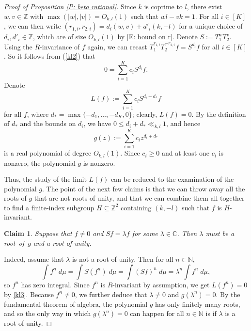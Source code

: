 \documentclass[11pt]{amsart}
\newtheorem{claim}[lemma]{Claim}
\theoremstyle{definition}
\newcommand{\N}{{\mathbb N}}
\newcommand{\Z}{{\mathbb Z}}
\newcommand{\1}{{\mathbf{1}}}
\begin{document}
\begin{proof}[Proof of Proposition \ref{P: beta rational}]
Since $k$ is coprime to $l$, there exist $w,v\in\mathbb{Z}$ with $\max(\vert w\vert, |v|)=O_{k,l}(1)$ such that $wl-vk=1$. For all $i\in[K]$, we can then write $(r_{1,i}, r_{2,i}) = d_{i}(w,v)+d'_{i}(k,-l)$ for a unique choice of $d_i, d'_i\in\Z$, which are of size $O_{k,l}(1)$ by \eqref{E: bound on r}. Denote $S:=T_1^w T_2^v$. Using the $R$-invariance of $f$ again, we can recast
$T_1^{r_{1,i}}T_2^{-r_{2,i}} f = S^{d_i} f$ for all $i\in[K]$. %
So it follows from (\ref{kl2}) that 
\begin{equation}\label{kl3}
    0=\sum_{i=1}^{K}c_{i}S^{d_{i}}f. %
\end{equation}
Denote 
$$L(f):=\sum_{i=1}^{K}c_{i}S^{d_{i}+d_{\ast}}f$$
for all $f$, where $d_{\ast}=\max\{-d_{1},\dots,-d_{K},0\}$; clearly, $L(f) = 0$. 
By the definition of $d_*$ and the bounds on $d_i$, we have $0\leq d_{i}+d_{\ast} \ll_{k,l}1$, and hence
$$g(z):=\sum_{i=1}^{K}c_{i}z^{d_{i}+d_{\ast}}$$ is a real polynomial of degree $O_{k,l}(1)$. Since $c_{i}\geq 0$ and at least one $c_{i}$ is nonzero, the polynomial $g$ is nonzero. 

Thus, the study of the limit $L(f)$ can be reduced to the examination of the polynomial $g$. The point of the next few claims is that we can throw away all the roots of $g$ that are not roots of unity, and that we can combine them all together to find a finite-index subgroup $H\subseteq\Z^2$ containing $(k,-l)$ such that $f$ is $H$-invariant.
    
\begin{claim}\label{Claim 1}
Suppose that $f\neq 0$ and $Sf=\lambda f$ for some $\lambda\in\mathbb{C}$.
Then $\lambda$ must be a root~of~$g$ and a root of unity. 
\end{claim}

Indeed, assume that $\lambda$ is not a root of unity. Then for all $n\in \N$, $$\int f^n\; d\mu = \int S(f^n)\; d\mu= \int (Sf)^n\; d\mu=\lambda^n\int f^n\; d\mu,$$ so $f^n$ has zero integral.  
Since $f^n$ is $R$-invariant by assumption, we get $L(f^n)=0$ by \eqref{kl3}. Because $f^n\neq 0$, we further deduce that $\lambda\neq 0$ and $g(\lambda^n)=0$. By the fundamental theorem of algebra, the polynomial $g$ has only finitely many roots, and so the only way in which $g(\lambda^n)=0$ can happen for all $n\in\N$ is if $\lambda$ is a root of unity.


\end{proof}
\end{document}
